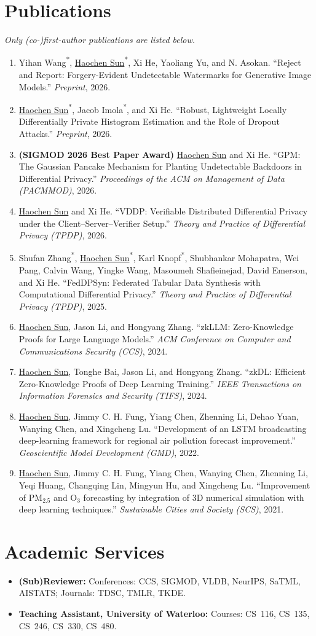 \documentclass[letterpaper,10pt]{article}
\newcommand{\resumeItem}[1]{
  \item\small{{#1 \vspace{-1pt}}}
}
\newcommand{\resumeItemListStart}{\begin{itemize}}
\newcommand{\resumeItemListEnd}{\end{itemize}}
\newcommand{\resumeEnumListStart}{\begin{enumerate}}
\newcommand{\resumeEnumListEnd}{\end{enumerate}}
\newcommand{\cofa}{\textsuperscript{*}}
\begin{document}
\section{Publications}
\textit{\small Only (co-)first-author publications are listed below.}
\resumeEnumListStart
  \resumeItem {Yihan Wang\cofa, \underline{Haochen Sun}\cofa, Xi He, Yaoliang Yu, and N. Asokan. ``Reject and Report: Forgery-Evident Undetectable Watermarks for Generative Image Models.'' \textit{Preprint}, 2026.}
  \resumeItem {\underline{Haochen Sun}\cofa, Jacob Imola\cofa, and Xi He. ``Robust, Lightweight Locally Differentially Private Histogram Estimation and the Role of Dropout Attacks.'' \textit{Preprint}, 2026.}
  \resumeItem {\label{pub:gpm} \textbf{(SIGMOD 2026 Best Paper Award)} \underline{Haochen Sun} and Xi He. ``GPM: The Gaussian Pancake Mechanism for Planting Undetectable Backdoors in Differential Privacy.'' \textit{Proceedings of the ACM on Management of Data (PACMMOD)}, 2026.}
  \resumeItem {\underline{Haochen Sun} and Xi He. ``VDDP: Verifiable Distributed Differential Privacy under the Client--Server--Verifier Setup.'' \textit{Theory and Practice of Differential Privacy (TPDP)}, 2026.}
  \resumeItem {Shufan Zhang\cofa, \underline{Haochen Sun}\cofa, Karl Knopf\cofa, Shubhankar Mohapatra, Wei Pang, Calvin Wang, Yingke Wang, Masoumeh Shafieinejad, David Emerson, and Xi He. ``FedDPSyn: Federated Tabular Data Synthesis with Computational Differential Privacy.'' \textit{Theory and Practice of Differential Privacy (TPDP)}, 2025.}
  \resumeItem {\underline{Haochen Sun}, Jason Li, and Hongyang Zhang. ``zkLLM: Zero-Knowledge Proofs for Large Language Models.'' \textit{ACM Conference on Computer and Communications Security (CCS)}, 2024.}
  \resumeItem {\underline{Haochen Sun}, Tonghe Bai, Jason Li, and Hongyang Zhang. ``zkDL: Efficient Zero-Knowledge Proofs of Deep Learning Training.'' \textit{IEEE Transactions on Information Forensics and Security (TIFS)}, 2024.}
  \resumeItem {\underline{Haochen Sun}, Jimmy C. H. Fung, Yiang Chen, Zhenning Li, Dehao Yuan, Wanying Chen, and Xingcheng Lu. ``Development of an LSTM broadcasting deep-learning framework for regional air pollution forecast improvement.'' \textit{Geoscientific Model Development (GMD)}, 2022.}
  \resumeItem {\underline{Haochen Sun}, Jimmy C. H. Fung, Yiang Chen, Wanying Chen, Zhenning Li, Yeqi Huang, Changqing Lin, Mingyun Hu, and Xingcheng Lu. ``Improvement of $\text{PM}_{2.5}$ and $\text{O}_{3}$ forecasting by integration of 3D numerical simulation with deep learning techniques.'' \textit{Sustainable Cities and Society (SCS)}, 2021.}
\resumeEnumListEnd

\section{Academic Services}
\resumeItemListStart
  \resumeItem{\textbf{(Sub)Reviewer:} Conferences: CCS, SIGMOD, VLDB, NeurIPS, SaTML, AISTATS; Journals: TDSC, TMLR, TKDE.}
  \resumeItem{\textbf{Teaching Assistant, University of Waterloo:} Courses: CS~116, CS~135, CS~246, CS~330, CS~480.}
\resumeItemListEnd

\end{document}
